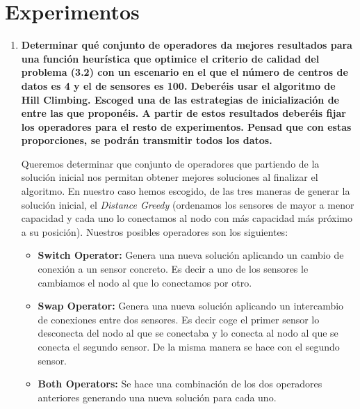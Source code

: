 \documentclass{article}
\begin{document}
\section{Experimentos}
\begin{enumerate}
  \item \textbf{Determinar qué conjunto de operadores da mejores resultados para una función heurística que optimice el criterio de calidad del problema (3.2) con un escenario en el que el número de centros de datos es 4 y el de sensores es 100. Deberéis usar el algoritmo de Hill Climbing. Escoged una de las estrategias de inicialización de entre las que proponéis. A partir de estos resultados deberéis fijar los operadores para el resto de experimentos. Pensad que con estas proporciones, se podrán transmitir todos los datos.}

  Queremos determinar que conjunto de operadores que partiendo de la solución inicial nos permitan obtener mejores soluciones al finalizar el algoritmo. En nuestro caso hemos escogido, de las tres maneras de generar la solución inicial, el \textit{Distance Greedy} (ordenamos los sensores de mayor a menor capacidad y cada uno lo conectamos al nodo con más capacidad más próximo a su posición).
  Nuestros posibles operadores son los siguientes:

  \begin{itemize}
    \item \textbf{Switch Operator:} Genera una nueva solución aplicando un cambio de conexión a un sensor concreto. Es decir a uno de los sensores le cambiamos el nodo al que lo conectamos por otro.
    \item \textbf{Swap Operator:} Genera una nueva solución aplicando un intercambio de conexiones entre dos sensores. Es decir coge el primer sensor lo desconecta del nodo al que se conectaba y lo conecta al nodo al que se conecta el segundo sensor. De la misma manera se hace con el segundo sensor.
    \item \textbf {Both Operators:} Se hace una combinación de los dos operadores anteriores generando una nueva solución para cada uno.
  \end{itemize}


\end{enumerate}
\end{document}
